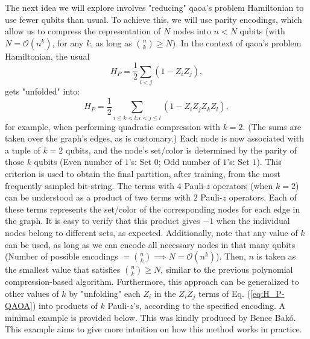 The next idea we will explore involves "reducing" \acrshort{qaoa}'s problem Hamiltonian to use fewer qubits than usual. To achieve this, we will use parity encodings, which allow us to compress the representation of \(N\) nodes into \(n < N\) qubits (with \(N = \mathcal{O}(n^k)\), for any \(k\), as long as \(\binom{n}{k} \geq N\)). In the context of \acrshort{qaoa}'s problem Hamiltonian, the usual
\begin{equation}\label{eq:H_P-QAOA}
    H_P = \frac{1}{2}\sum\limits_{i<j}(1-Z_iZ_j),
\end{equation}
gets "unfolded" into:
\begin{equation}\label{eq:H_P-QAOA-k=2}
    H_P = \frac{1}{2}\sum\limits_{i \leq k<l;i<j \leq l}(1-Z_iZ_jZ_kZ_l),
\end{equation}
for example, when performing quadratic compression with \(k = 2\). (The sums are taken over the graph's edges, as is customary.) Each node is now associated with a tuple of \(k = 2\) qubits, and the node's set/color is determined by the parity of those \(k\) qubits (Even number of $1$'s: Set $0$; Odd number of $1$'s: Set $1$). This criterion is used to obtain the final partition, after training, from the most frequently sampled bit-string. The terms with $4$ Pauli-$z$ operators (when \(k = 2\)) can be understood as a product of two terms with $2$ Pauli-$z$ operators. Each of these terms represents the set/color of the corresponding nodes for each edge in the graph. It is easy to verify that this product gives $-1$ when the individual nodes belong to different sets, as expected. Additionally, note that any value of \(k\) can be used, as long as we can encode all necessary nodes in that many qubits (Number of possible encodings \(= \binom{n}{k} \implies N = \mathcal{O}(n^k)\)). Then, \(n\) is taken as the smallest value that satisfies \(\binom{n}{k} \geq N\), similar to the previous polynomial compression-based algorithm. Furthermore, this approach can be generalized to other values of \(k\) by "unfolding" each \(Z_i\) in the \(Z_i Z_j\) terms of Eq. (\ref{eq:H_P-QAOA}) into products of \(k\) Pauli-$z$'s, according to the specified encoding. A minimal example is provided below. This was kindly produced by Bence Bakó. This example aims to give more intuition on how this method works in practice.

